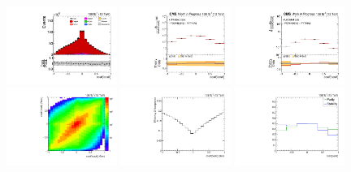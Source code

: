 \begin{refsection}
\begin{figure}[htb]
\begin{center}
\label{fig:c_rr_uncertainties}
\end{center}
\end{figure}
\clearpage
\begin{figure}[htb]
\begin{center}
 \includegraphics[width=0.32\textwidth]{fig_fullRun2UL/controlplots/combined/Hyp_LLBarCnn.pdf}
 \includegraphics[width=0.32\textwidth]{fig_fullRun2UL/unfolding/combined/UnfoldedResults_c_nn.pdf}
 \includegraphics[width=0.32\textwidth]{fig_fullRun2UL/unfolding/combined/UnfoldedResultsNorm_c_nn.pdf} \\
 \includegraphics[width=0.32\textwidth]{fig_fullRun2UL/unfolding/combined/ResponseMatrix_c_nn.pdf}
 \includegraphics[width=0.32\textwidth]{fig_fullRun2UL/unfolding/combined/TotEff_c_nn.pdf}
 \includegraphics[width=0.32\textwidth]{fig_fullRun2UL/unfolding/combined/PurStab_c_nn.pdf} \\

\end{center}
\end{figure}
\end{refsection}
